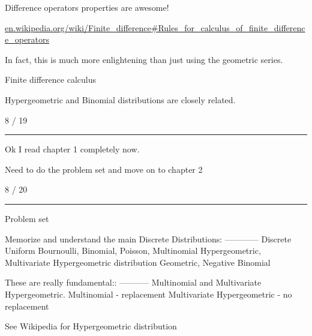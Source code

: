 \documentclass[12pt, reqno]{amsart}
\numberwithin{equation}{section}
\begin{document}
Difference operators properties are awesome!

\url{en.wikipedia.org/wiki/Finite_difference#Rules_for_calculus_of_finite_difference_operators}

In fact, this is much more enlightening than just using the geometric series.

Finite difference calculus

Hypergeometric and Binomial distributions are closely related.


8 / 19
\rule{\textwidth}{.5pt}

Ok I read chapter 1 completely now.

Need to do the problem set and move on to chapter 2

8 / 20
\rule{\textwidth}{.5pt}

Problem set

Memorize and understand the main Discrete Distributions:
------------
Discrete Uniform
Bournoulli, Binomial, Poisson, Multinomial
Hypergeometric, Multivariate Hypergeometric distribution
Geometric, Negative Binomial

These are really fundamental::
-----------
Multinomial and Multivariate Hypergeometric.
Multinomial - replacement
Multivariate Hypergeometric - no replacement

See Wikipedia for Hypergeometric distribution
\end{document}
